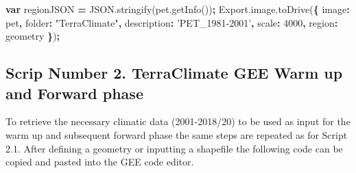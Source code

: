\documentclass[
  10pt,
  b5paper,
]{book}
\newenvironment{Shaded}{\begin{snugshade}}{\end{snugshade}}
\newcommand{\AttributeTok}[1]{\textcolor[rgb]{0.77,0.63,0.00}{#1}}
\newcommand{\DataTypeTok}[1]{\textcolor[rgb]{0.13,0.29,0.53}{#1}}
\newcommand{\DecValTok}[1]{\textcolor[rgb]{0.00,0.00,0.81}{#1}}
\newcommand{\KeywordTok}[1]{\textcolor[rgb]{0.13,0.29,0.53}{\textbf{#1}}}
\newcommand{\NormalTok}[1]{#1}
\newcommand{\OperatorTok}[1]{\textcolor[rgb]{0.81,0.36,0.00}{\textbf{#1}}}
\newcommand{\StringTok}[1]{\textcolor[rgb]{0.31,0.60,0.02}{#1}}
\newcommand{\VariableTok}[1]{\textcolor[rgb]{0.00,0.00,0.00}{#1}}
\begin{document}
\begin{Shaded}
\begin{Highlighting}[]
\KeywordTok{var}\NormalTok{ regionJSON }\OperatorTok{=} \VariableTok{JSON}\NormalTok{.}\AttributeTok{stringify}\NormalTok{(}\VariableTok{pet}\NormalTok{.}\AttributeTok{getInfo}\NormalTok{())}\OperatorTok{;}
\VariableTok{Export}\NormalTok{.}\VariableTok{image}\NormalTok{.}\AttributeTok{toDrive}\NormalTok{(}\OperatorTok{\{}
          \DataTypeTok{image}\OperatorTok{:}\NormalTok{ pet}\OperatorTok{,}
          \DataTypeTok{folder}\OperatorTok{:} \StringTok{"TerraClimate"}\OperatorTok{,}
          \DataTypeTok{description}\OperatorTok{:} \StringTok{'PET_1981-2001'}\OperatorTok{,} 
          \DataTypeTok{scale}\OperatorTok{:} \DecValTok{4000}\OperatorTok{,}
          \DataTypeTok{region}\OperatorTok{:}\NormalTok{ geometry}
\OperatorTok{\}}\NormalTok{)}\OperatorTok{;}
\end{Highlighting}
\end{Shaded}

\hypertarget{scrip-number-2.-terraclimate-gee-warm-up-and-forward-phase}{%
\subsection{Scrip Number 2. TerraClimate GEE Warm up and Forward phase}\label{scrip-number-2.-terraclimate-gee-warm-up-and-forward-phase}}

To retrieve the necessary climatic data (2001-2018/20) to be used as input for the warm up and subsequent forward phase the same steps are repeated as for Script 2.1. After defining a geometry or inputting a shapefile the following code can be copied and pasted into the GEE code editor.
\end{document}
